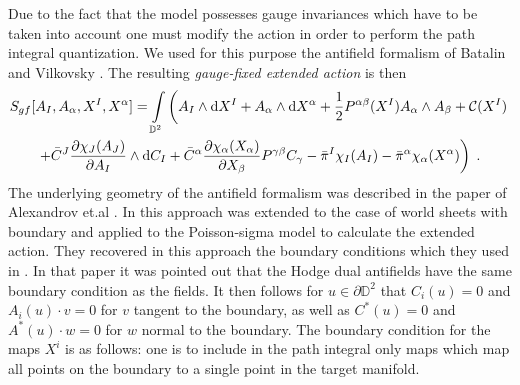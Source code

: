 \documentclass[a4paper,twoside,11pt]{article}
\numberwithin{equation}{section}
\begin{document}
Due to the fact that the model possesses gauge invariances which have to be taken into account one must 
modify the action in order to perform the path integral quantization. We used for this purpose the antifield formalism of Batalin and Vilkovsky \cite{BV}. The resulting {\it gauge-fixed extended action} is then \cite{HS}
\begin{multline}
S_{gf}[A_I,A_\alpha,X^I,X^\alpha]=  \int\limits_{\mathbb{D}^2}\left(A_I\wedge{\rm d}X^I+A_\alpha\wedge
\mathrm d X^\alpha+
\frac{1}{2}P^{\alpha\beta}(X^I)A_\alpha\wedge A_\beta+\mathcal{C}(X^I)\right.\\
\left.+\bar{C}^{ J}\frac{\partial\chi_J(A_J)}{\partial A_I}\wedge{\rm d}C_{I}+
\bar{C}^{\alpha}\frac{\partial\chi_\alpha(X_\alpha)}{\partial X_\beta}P^{\gamma\beta}C_{\gamma}
-\bar{\pi}^I\chi_I(A_I)-\bar{\pi}^\alpha\chi_\alpha(X^\alpha)\right)\;.
\label{action}
\end{multline}
The underlying geometry of the antifield formalism was described in the paper of Alexandrov et.al 
\cite{AKSZ}. In \cite{CF2} this approach was extended to the case of world sheets with boundary and applied to the Poisson-sigma model to calculate the extended 
action. They recovered in this approach the boundary conditions which they used in \cite{CF1}. In that paper it was pointed out that the Hodge dual 
antifields have the same boundary condition as the fields. It then follows for $u\in\partial\mathbb{D}^2$ 
that $C_i(u)=0$ and $A_i(u)\cdot v=0$ for $v$ tangent to the boundary, as well as 
$C^\ast(u)=0$ and $A^\ast(u)\cdot w=0$ for $w$ normal to the boundary. The boundary 
condition for the maps $X^i$ is as follows: one is to include in the path integral only maps which
map all points on the boundary to a single point in the target manifold. 

%
%
\end{document}
